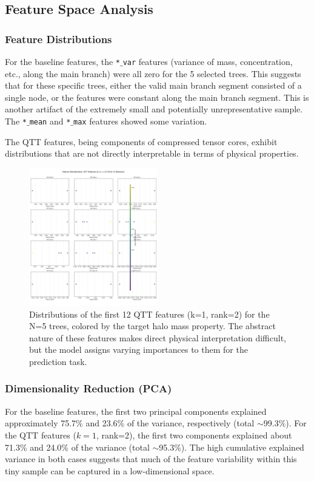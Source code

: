 \documentclass[twocolumn]{aastex631}
\begin{document}
\subsection{Feature Space Analysis}

\subsubsection{Feature Distributions}
For the baseline features, the \texttt{*\ensuremath{\_}var} features (variance of mass, concentration, etc., along the main branch) were all zero for the 5 selected trees. This suggests that for these specific trees, either the valid main branch segment consisted of a single node, or the features were constant along the main branch segment. This is another artifact of the extremely small and potentially unrepresentative sample. The \texttt{*\ensuremath{\_}mean} and \texttt{*\ensuremath{\_}max} features showed some variation.

The QTT features, being components of compressed tensor cores, exhibit distributions that are not directly interpretable in terms of physical properties.

\begin{figure}[h!]
    \centering
    \includegraphics[width=0.5\textwidth]{../input_files/plots/feature_dist_qtt_features_(k=1,_r=2)_2_20250524-175501.png}
    \caption{Distributions of the first 12 QTT features (k=1, rank=2) for the N=5 trees, colored by the target halo mass property. The abstract nature of these features makes direct physical interpretation difficult, but the model assigns varying importances to them for the prediction task.
}
    \label{fig:feature_dist_qtt}
\end{figure}

\subsubsection{Dimensionality Reduction (PCA)}
For the baseline features, the first two principal components explained approximately 75.7\% and 23.6\% of the variance, respectively (total $\sim$99.3\%). For the QTT features ($k=1$, rank=2), the first two components explained about 71.3\% and 24.0\% of the variance (total $\sim$95.3\%). The high cumulative explained variance in both cases suggests that much of the feature variability within this tiny sample can be captured in a low-dimensional space.
\end{document}
